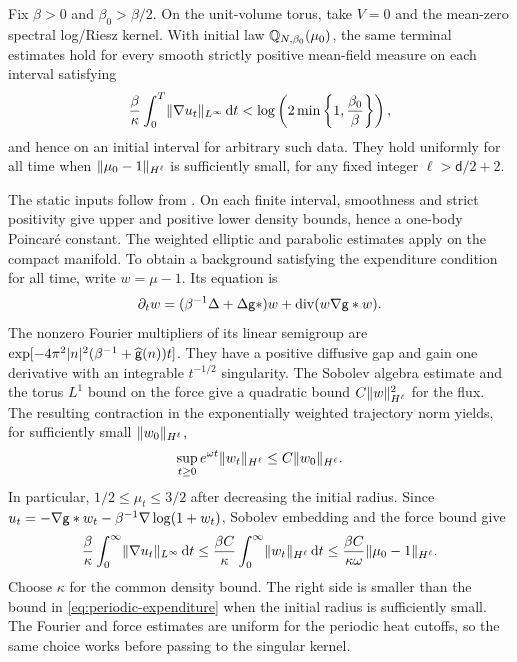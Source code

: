 \documentclass[11pt,reqno]{amsart}
\numberwithin{equation}{section}
\theoremstyle{plain}
\theoremstyle{remark}
\DeclarePairedDelimiter{\norm}{\lVert}{\rVert}
\renewcommand{\d}{\mathsf{d}}\newcommand{\s}{\mathsf{s}}
\DeclareMathOperator{\diver}{div}
\begin{document}
\begin{remark}\label{rem:periodic}
Fix $\beta>0$ and $\beta_0>\beta/2$. On the unit-volume torus, take $V=0$ and the mean-zero spectral log/Riesz kernel. With initial law $\mathbb Q_{N,\beta_0}(\mu_0)$, the same terminal estimates hold for every smooth strictly positive mean-field measure on each interval satisfying
\begin{equation}\label{eq:periodic-expenditure}
 \frac\beta\kappa\int_0^T\norm{\nabla u_t}_{L^\infty}\dd t
 <\log\left(2\min\left\{1,\frac{\beta_0}{\beta}\right\}\right),
\end{equation}
and hence on an initial interval for arbitrary such data. They hold uniformly for all time when $\norm{\mu_0-1}_{H^\ell}$ is sufficiently small, for any fixed integer $\ell>\d/2+2$.

The static inputs follow from \cite[Remark~2.1]{DGRpartition}. On each finite interval, smoothness and strict positivity give upper and positive lower density bounds, hence a one-body Poincar\'e constant. The weighted elliptic and parabolic estimates apply on the compact manifold. To obtain a background satisfying the expenditure condition for all time, write $w=\mu-1$. Its equation is
\begin{equation}\label{eq:periodic-background}
 \partial_tw=(\beta^{-1}\Delta+\Delta\g*)w+
                     \diver(w\nabla\g*w).
\end{equation}
The nonzero Fourier multipliers of its linear semigroup are
$\exp[-4\pi^2|n|^2(\beta^{-1}+\widehat{\mathsf g}(n))t]$.
They have a positive diffusive gap and gain one derivative with an integrable $t^{-1/2}$ singularity. The Sobolev algebra estimate and the torus $L^1$ bound on the force give a quadratic bound $C\norm w_{H^\ell}^2$ for the flux. The resulting contraction in the exponentially weighted trajectory norm yields, for sufficiently small $\norm{w_0}_{H^\ell}$,
\begin{equation}\label{eq:periodic-background-decay}
 \sup_{t\ge0}e^{\omega t}\norm{w_t}_{H^\ell}
 \le C\norm{w_0}_{H^\ell}.
\end{equation}
In particular, $1/2\le\mu_t\le3/2$ after decreasing the initial radius. Since
$u_t=-\nabla\mathsf g*w_t-\beta^{-1}\nabla\log(1+w_t)$, Sobolev embedding and the force bound give
\begin{equation}\label{eq:periodic-velocity-budget}
 \frac\beta\kappa\int_0^\infty\norm{\nabla u_t}_{L^\infty}\dd t
 \le\frac{\beta C}{\kappa}\int_0^\infty\norm{w_t}_{H^\ell}\dd t
 \le\frac{\beta C}{\kappa\omega}\norm{\mu_0-1}_{H^\ell}.
\end{equation}
Choose $\kappa$ for the common density bound. The right side is smaller than the bound in \eqref{eq:periodic-expenditure} when the initial radius is sufficiently small. The Fourier and force estimates are uniform for the periodic heat cutoffs, so the same choice works before passing to the singular kernel.


\end{remark}
\end{document}

